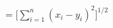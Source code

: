\documentclass[preview]{standalone}
\begin{document}
\begin{align*}
= \Biggl\lbrack \sum_{i=1}^{n} (x_{i}-y_{i})^{2} \Biggr\rbrack ^{1/2}
\end{align*}
\end{document}
